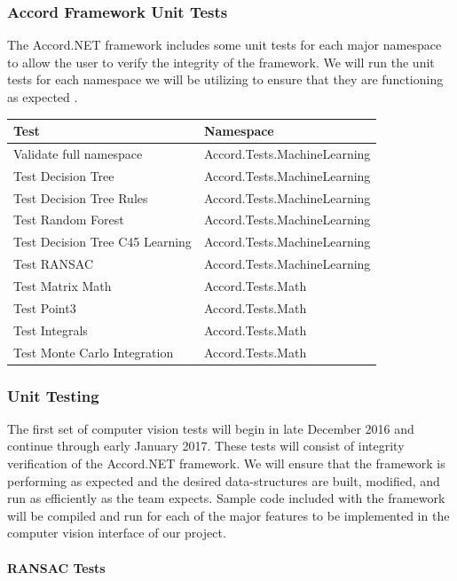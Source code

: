 \documentclass[12pt]{article}
\begin{document}
\subsubsection{Accord Framework Unit
Tests}\label{accord-framework-unit-tests}

The Accord.NET framework includes some unit tests for each major
namespace to allow the user to verify the integrity of the framework. We
will run the unit tests for each namespace we will be utilizing to
ensure that they are functioning as expected \autocite{accord}.

\begin{longtable}[]{@{}ll@{}}
\toprule
Test & Namespace\tabularnewline
\midrule
\endhead
Validate full namespace & Accord.Tests.MachineLearning\tabularnewline
Test Decision Tree & Accord.Tests.MachineLearning\tabularnewline
Test Decision Tree Rules & Accord.Tests.MachineLearning\tabularnewline
Test Random Forest & Accord.Tests.MachineLearning\tabularnewline
Test Decision Tree C45 Learning &
Accord.Tests.MachineLearning\tabularnewline
Test RANSAC & Accord.Tests.MachineLearning\tabularnewline
Test Matrix Math & Accord.Tests.Math\tabularnewline
Test Point3 & Accord.Tests.Math\tabularnewline
Test Integrals & Accord.Tests.Math\tabularnewline
Test Monte Carlo Integration & Accord.Tests.Math\tabularnewline
\bottomrule
\end{longtable}

\subsubsection{Unit Testing}\label{unit-testing}

The first set of computer vision tests will begin in late December 2016
and continue through early January 2017. These tests will consist of
integrity verification of the Accord.NET framework. We will ensure that
the framework is performing as expected and the desired data-structures
are built, modified, and run as efficiently as the team expects. Sample
code included with the framework will be compiled and run for each of
the major features to be implemented in the computer vision interface of
our project.

\paragraph{RANSAC Tests}\label{ransac-tests}
\end{document}
